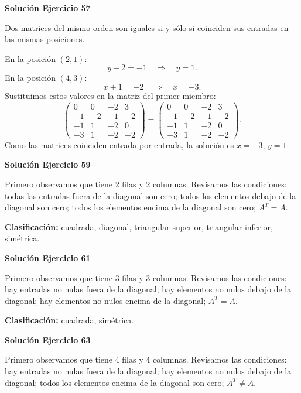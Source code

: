 \par\bigskip\noindent\textbf{Solución Ejercicio 57}\par\nobreak
Dos matrices del mismo orden son iguales si y sólo si coinciden sus entradas en las mismas posiciones.

En la posición $(2,1)$:
\[
y - 2=-1\quad\Longrightarrow\quad y=1.
\]
En la posición $(4,3)$:
\[
x + 1=-2\quad\Longrightarrow\quad x=-3.
\]
Sustituimos estos valores en la matriz del primer miembro:
\[
\begin{pmatrix}0&0&-2&3\\-1&-2&-1&-2\\-1&1&-2&0\\-3&1&-2&-2\end{pmatrix}=\begin{pmatrix}0&0&-2&3\\-1&-2&-1&-2\\-1&1&-2&0\\-3&1&-2&-2\end{pmatrix}.
\]
Como las matrices coinciden entrada por entrada, la solución es $x=-3$, $y=1$.


\par\bigskip\noindent\textbf{Solución Ejercicio 59}\par\nobreak
Primero observamos que tiene 2 filas y 2 columnas. Revisamos las condiciones: todas las entradas fuera de la diagonal son cero; todos los elementos debajo de la diagonal son cero; todos los elementos encima de la diagonal son cero; $A^T=A$.

\textbf{Clasificación:} cuadrada, diagonal, triangular superior, triangular inferior, simétrica.


\par\bigskip\noindent\textbf{Solución Ejercicio 61}\par\nobreak
Primero observamos que tiene 3 filas y 3 columnas. Revisamos las condiciones: hay entradas no nulas fuera de la diagonal; hay elementos no nulos debajo de la diagonal; hay elementos no nulos encima de la diagonal; $A^T=A$.

\textbf{Clasificación:} cuadrada, simétrica.


\par\bigskip\noindent\textbf{Solución Ejercicio 63}\par\nobreak
Primero observamos que tiene 4 filas y 4 columnas. Revisamos las condiciones: hay entradas no nulas fuera de la diagonal; hay elementos no nulos debajo de la diagonal; todos los elementos encima de la diagonal son cero; $A^T\ne A$.

